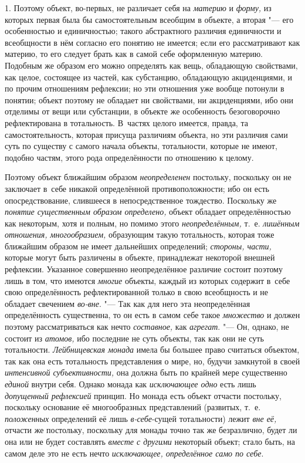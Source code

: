 1. Поэтому объект, во-первых, не различает себя на {\em материю} и
{\em форму,} из которых первая была бы самостоятельным всеобщим в объекте,
а вторая "--- его особенностью и единичностью; такого абстрактного
различия единичности и всеобщности в нём согласно его понятию не имеется;
если его рассматривают как материю, то его следует брать как в самой себе
оформленную материю. Подобным же образом его можно определять как вещь,
обладающую свойствами, как целое, состоящее из частей, как субстанцию,
обладающую акциденциями, и по прочим отношениям рефлексии; но эти отношения
уже вообще потонули в понятии; объект поэтому не обладает ни свойствами, ни
акциденциями, ибо они отделимы от вещи или субстанции, в объекте же
особенность безоговорочно рефлектирована в тотальность. В~частях целого
имеется, правда, та самостоятельность, которая присуща различиям объекта,
но эти различия сами суть по существу с самого начала объекты, тотальности,
которые не имеют, подобно частям, этого рода определённости по отношению к
целому.

Поэтому объект ближайшим образом {\em неопределенен}
постольку, поскольку он не заключает в~себе никакой
определённой противоположности; ибо он есть опосредствование, слившееся в
непосредственное тождество. Поскольку же {\em понятие существенным образом
определено,} объект обладает определённостью как некоторым,
хотя и полным, но помимо этого {\em неопределённым,}
т.~е. {\em лишённым отношения, многообразием,} образующим такую тотальность,
которая тоже ближайшим образом не имеет дальнейших определений;
{\em стороны, части,}
которые могут быть различены в объекте, принадлежат некоторой
внешней рефлексии. Указанное совершенно неопределённое различие состоит
поэтому лишь в том, что имеются {\em многие} объекты,
каждый из которых содержит в~себе свою определённость рефлектированной
только в свою всеобщность и не обладает свечением {\em во-вне}. "--- Так как
для него эта неопределённая определённость существенна, то он есть в самом
себе такое {\em множество} и должен поэтому рассматриваться как нечто
{\em составное,} как {\em агрегат}. "--- Он,
однако, не состоит из {\em атомов,}
ибо последние не суть объекты, так как они не суть
тотальности. {\em Лейбницевская монада}
имела бы большее право считаться объектом, так как она есть
тотальность представления о мире, но, будучи замкнутой в своей
{\em интенсивной субъективности,} она должна быть по крайней мере существенно
{\em единой} внутри себя. Однако монада как {\em исключающее
одно} есть лишь {\em допущенный рефлексией}
принцип. Но монада есть объект отчасти постольку, поскольку
основание её многообразных представлений (развитых, т.~е.
{\em положенных} определений её лишь {\em в-себе}-сущей
тотальности) лежит {\em вне её,}
отчасти же постольку, поскольку для монады точно так же
безразлично, будет ли она или не будет составлять {\em вместе с другими}
некоторый объект; стало быть, на самом деле это не есть нечто
{\em исключающее, определённое само по себе}.

